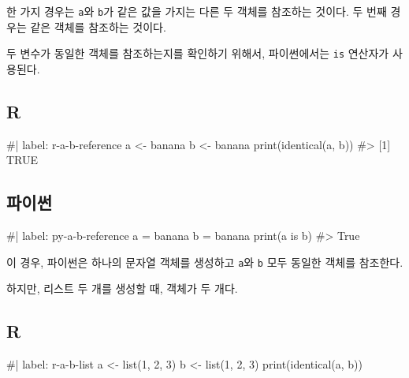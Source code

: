 \documentclass[
  letterpaper,
]{book}
\newenvironment{Shaded}{\begin{snugshade}}{\end{snugshade}}
\newcommand{\NormalTok}[1]{\textcolor[rgb]{0.00,0.23,0.31}{#1}}
\begin{document}
한 가지 경우는 \texttt{a}와 \texttt{b}가 같은 값을 가지는 다른 두 객체를
참조하는 것이다. 두 번째 경우는 같은 객체를 참조하는 것이다.

두 변수가 동일한 객체를 참조하는지를 확인하기 위해서, 파이썬에서는
\texttt{is} 연산자가 사용된다.

\subsection{R}

\begin{Shaded}
\begin{Highlighting}[]
\NormalTok{\#| label: r{-}a{-}b{-}reference}
\NormalTok{a \textless{}{-} \textquotesingle{}banana\textquotesingle{}}
\NormalTok{b \textless{}{-} \textquotesingle{}banana\textquotesingle{}}
\NormalTok{print(identical(a, b))}
\NormalTok{\#\textgreater{} [1] TRUE}
\end{Highlighting}
\end{Shaded}

\subsection{파이썬}

\begin{Shaded}
\begin{Highlighting}[]
\NormalTok{\#| label: py{-}a{-}b{-}reference}
\NormalTok{a = \textquotesingle{}banana\textquotesingle{}}
\NormalTok{b = \textquotesingle{}banana\textquotesingle{}}
\NormalTok{print(a is b)}
\NormalTok{\#\textgreater{} True}
\end{Highlighting}
\end{Shaded}

이 경우, 파이썬은 하나의 문자열 객체를 생성하고 \texttt{a}와 \texttt{b}
모두 동일한 객체를 참조한다. 

하지만, 리스트 두 개를 생성할 때, 객체가 두 개다.

\subsection{R}

\begin{Shaded}
\begin{Highlighting}[]
\NormalTok{\#| label: r{-}a{-}b{-}list}
\NormalTok{a \textless{}{-} list(1, 2, 3)}
\NormalTok{b \textless{}{-} list(1, 2, 3)}
\NormalTok{print(identical(a, b))}
\end{Highlighting}
\end{Shaded}
\end{document}
